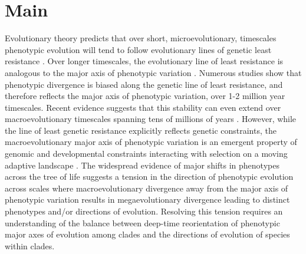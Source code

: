 \documentclass[12pt,letterpaper]{article}
\begin{document}
\section{Main}

Evolutionary theory predicts that over short, microevolutionary, timescales phenotypic evolution will tend to follow evolutionary lines of genetic least resistance \cite{schluter1996adaptive}.
Over longer timescales, the evolutionary line of least resistance is analogous to the major axis of phenotypic variation \cite{marroig2005size,fasanelli2022allometry}.
Numerous studies show that phenotypic divergence is biased along the genetic line of least resistance, and therefore reflects the major axis of phenotypic variation, over 1-2 million year timescales.
Recent evidence suggests that this stability can even extend over macroevolutionary timescales spanning tens of millions of years \cite{mcglothlin2018adaptive}.
However, while the line of least genetic resistance explicitly reflects genetic constraints, the macroevolutionary major axis of phenotypic variation is an emergent property of genomic and developmental constraints interacting with selection on a moving adaptive landscape \cite{jones2004evolution}.
The widespread evidence of major shifts in phenotypes across the tree of life \cite{pagel2022general,cooney2017mega,venditti2011multiple,khabbazian2016fast,smaers2021evolution} suggests a tension in the direction of phenotypic evolution across scales where macroevolutionary divergence away from the major axis of phenotypic variation results in megaevolutionary divergence leading to distinct phenotypes and/or directions of evolution.
Resolving this tension requires an understanding of the balance between deep-time reorientation of phenotypic major axes of evolution among clades and the directions of evolution of species within clades.
\end{document}
